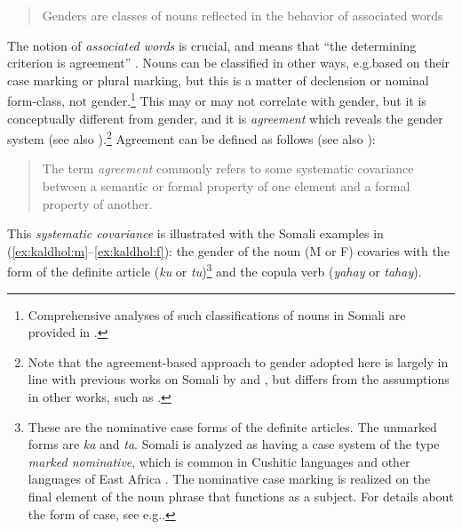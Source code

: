 \documentclass[output=paper]{langscibook}
\begin{document}
\begin{quotation}
    Genders are classes of nouns reflected in the behavior of associated words \citep[231]{Hockett1958}
\end{quotation}
The notion of \textit{associated words} is crucial, and means that ``the determining criterion is agreement'' \citep[4]{Corbett1991}. Nouns can be classified in other ways, e.g.\@ based on their case marking or plural marking, but this is a matter of declension or nominal form-class, not gender.\footnote{Comprehensive analyses of such classifications of nouns in Somali are provided in \@ \cite{Andrzejewski1964,Banti1988,Saeed1999a}.} This may or may not correlate with gender, but it is conceptually different from gender, and it is \textit{agreement} which reveals the gender system (see also \citealt{Gueldemann2019,DiGarbo2014,DiGarbo2016}).\footnote{Note that the agreement-based approach to gender adopted here is largely in line with previous works on Somali by \textcite{Nilsson2016} and \textcite{Gueldemann2016}, but differs from the assumptions in other works, such as \textcite{Godon1998,Lampitelli2013,Lampitelli2019,Lecarme2002}.} 
Agreement can be defined as follows (see also \citealt[4]{Corbett2006}):

\begin{quotation}
    The term \textit{agreement} commonly refers to some systematic covariance between a semantic or formal property of one element and a formal property of another. \citep[610]{Steele1978}
\end{quotation}
This \textit{systematic covariance} is illustrated with the Somali examples in (\ref{ex:kaldhol:m}--\ref{ex:kaldhol:f}): the gender of the noun (M or F) covaries with the form of the definite article (\textit{ku} or \textit{tu})\footnote{These are the nominative case forms of the definite articles. The unmarked forms are \textit{ka} and \textit{ta}. Somali is analyzed as having a case system of the type \textit{marked nominative}, which is common in Cushitic languages \citep{Mous2012} and other languages of East Africa \citep{Koenig2006}. The nominative case marking is realized on the final element of the noun phrase that functions as a subject. For details about the form of case, see e.g.\@ \textcite{Banti1986,Banti1988}.} 
and the copula verb (\textit{yahay} or \textit{tahay}).
\end{document}
